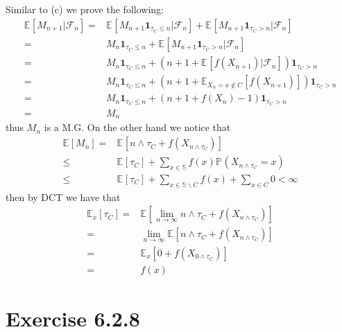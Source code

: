 \documentclass[11pt,a4paper]{ctexart}
\numberwithin{equation}{section}%
\newcommand{\F}{\mathcal{F}}
\begin{document}
\subsection{}

Similar to (c) we prove the following:
\begin{align*}
     \mathbb{E}_{  }\left[ M_{n+1} | \F_n \right] =& \mathbb{E}_{  }\left[ M_{n+1} \mathbf{1}_{\tau_C \leq n} | \F_n \right] + \mathbb{E}_{  }\left[ M_{n+1} \mathbf{1}_{\tau_C > n} | \F_n \right] \\
     =& M_n \mathbf{1}_{\tau_C \leq n} + \mathbb{E}_{  }\left[ M_{n+1} \mathbf{1}_{\tau_C > n} | \F_n \right] \\ 
     =& M_n \mathbf{1}_{\tau_C \leq n} + (n+1 + \mathbb{E}_{  }\left[ f(X_{n + 1}) | \F_n \right])\mathbf{1}_{\tau_C > n}\\ 
     =& M_n \mathbf{1}_{\tau_C \leq n} + (n+1 + \mathbb{E}_{ X_n=x\not\in C }\left[ f(X_{n+1}) \right] )\mathbf{1}_{\tau_C > n}\\
     =& M_n \mathbf{1}_{\tau_C \leq n} + (n+1 + f(X_n)-1 )\mathbf{1}_{\tau_C > n}\\
     =& M_n
\end{align*}
thus $ M_n $ is a M.G. On the other hand we notice that
\begin{align*}
    \mathbb{E}_{  }\left[ M_n \right] =& \mathbb{E}_{  }\left[ n\wedge \tau_C + f(X_{n\wedge \tau_C}) \right] \\
    \leq& \mathbb{E}_{  }\left[ \tau_C \right] + \sum_{x\in \mathbb{S}}f(x) \mathbb{P}_{  }\left( X_{n\wedge \tau_C} = x \right) \\ 
    \leq& \mathbb{E}_{  }\left[ \tau_C \right] + \sum_{x\in \mathbb{S}\backslash C}f(x) + \sum_{x\in C} 0 <\infty
\end{align*}
then by DCT we have that
\begin{align*}
    \mathbb{E}_{ x }\left[ \tau_C \right] =& \mathbb{E}_{  }\left[ \lim_{n\to\infty} n\wedge\tau_C + f(X_{n\wedge \tau_C}) \right] \\
    =& \lim_{n\to\infty} \mathbb{E}_{  }\left[ n\wedge\tau_C + f(X_{n\wedge \tau_C}) \right] \\
    =&   \mathbb{E}_{ x }\left[ 0 + f(X_{0\wedge \tau_C}) \right] \\
    =& f(x)
\end{align*}


\section{Exercise 6.2.8}
\end{document}
